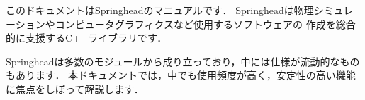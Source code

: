 \KLUDGE このドキュメントはSpringhead\KLUDGE のマニュアルです．
Springhead\KLUDGE は物理シミュレーションやコンピュータグラフィクスなど使用するソフトウェアの
\KLUDGE 作成を総合的に支援するC++\KLUDGE ライブラリです．

Springhead\KLUDGE は多数のモジュールから成り立っており，中には仕様が流動的なものもあります．
\KLUDGE 本ドキュメントでは，中でも使用頻度が高く，安定性の高い機能に焦点をしぼって解説します．
